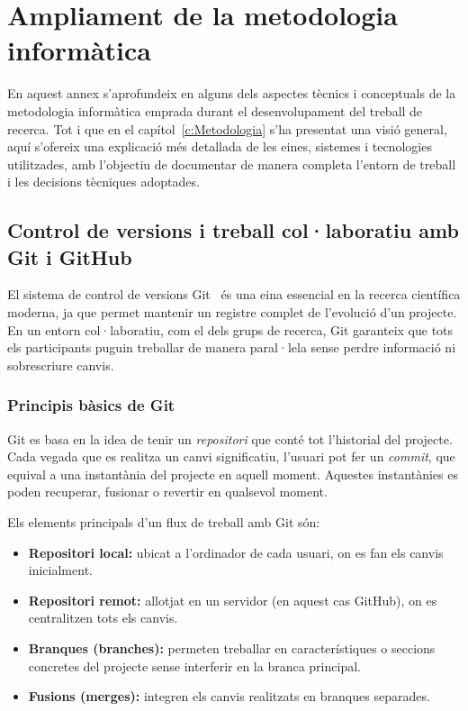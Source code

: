 \chapter{Ampliament de la metodologia informàtica}
\label{a:metodologia_informàtica}

En aquest annex s’aprofundeix en alguns dels aspectes tècnics i conceptuals de la metodologia informàtica emprada durant el desenvolupament del treball de recerca. Tot i que en el capítol~\ref{c:Metodologia} s’ha presentat una visió general, aquí s’ofereix una explicació més detallada de les eines, sistemes i tecnologies utilitzades, amb l’objectiu de documentar de manera completa l’entorn de treball i les decisions tècniques adoptades.

\section{Control de versions i treball col·laboratiu amb Git i GitHub}
El sistema de control de versions Git~\cite{git} és una eina essencial en la recerca científica moderna, ja que permet mantenir un registre complet de l’evolució d’un projecte. En un entorn col·laboratiu, com el dels grups de recerca, Git garanteix que tots els participants puguin treballar de manera paral·lela sense perdre informació ni sobrescriure canvis.

\subsection{Principis bàsics de Git}
Git es basa en la idea de tenir un \textit{repositori} que conté tot l’historial del projecte. Cada vegada que es realitza un canvi significatiu, l’usuari pot fer un \textit{commit}, que equival a una instantània del projecte en aquell moment. Aquestes instantànies es poden recuperar, fusionar o revertir en qualsevol moment.

Els elements principals d’un flux de treball amb Git són:
\begin{itemize}
  \item \textbf{Repositori local:} ubicat a l’ordinador de cada usuari, on es fan els canvis inicialment.
  \item \textbf{Repositori remot:} allotjat en un servidor (en aquest cas GitHub), on es centralitzen tots els canvis.
  \item \textbf{Branques (branches):} permeten treballar en característiques o seccions concretes del projecte sense interferir en la branca principal.
  \item \textbf{Fusions (merges):} integren els canvis realitzats en branques separades.
\end{itemize}

